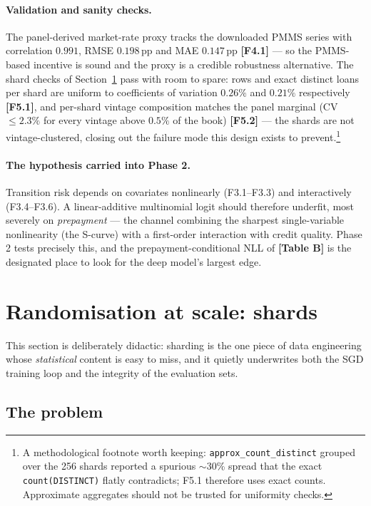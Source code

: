 \documentclass[11pt,a4paper]{article}
\newcommand{\code}[1]{\texttt{#1}}
\newcommand{\artifact}[1]{\textbf{[#1]}}
\begin{document}
\paragraph{Validation and sanity checks.} The panel-derived market-rate proxy tracks the downloaded PMMS series with correlation $0.991$, RMSE $0.198$\,pp and MAE $0.147$\,pp \artifact{F4.1} --- so the PMMS-based incentive is sound and the proxy is a credible robustness alternative. The shard checks of Section~\ref{sec:shards} pass with room to spare: rows and exact distinct loans per shard are uniform to coefficients of variation $0.26\%$ and $0.21\%$ respectively \artifact{F5.1}, and per-shard vintage composition matches the panel marginal (CV $\le 2.3\%$ for every vintage above $0.5\%$ of the book) \artifact{F5.2} --- the shards are not vintage-clustered, closing out the failure mode this design exists to prevent.\footnote{A methodological footnote worth keeping: \code{approx\_count\_distinct} grouped over the 256 shards reported a spurious $\sim$30\% spread that the exact \code{count(DISTINCT)} flatly contradicts; F5.1 therefore uses exact counts. Approximate aggregates should not be trusted for uniformity checks.}

\paragraph{The hypothesis carried into Phase 2.} Transition risk depends on covariates nonlinearly (F3.1--F3.3) and interactively (F3.4--F3.6). A linear-additive multinomial logit should therefore underfit, most severely on \emph{prepayment} --- the channel combining the sharpest single-variable nonlinearity (the S-curve) with a first-order interaction with credit quality. Phase 2 tests precisely this, and the prepayment-conditional NLL of \artifact{Table B} is the designated place to look for the deep model's largest edge.

\section{Randomisation at scale: shards}\label{sec:shards}

This section is deliberately didactic: sharding is the one piece of data engineering whose \emph{statistical} content is easy to miss, and it quietly underwrites both the SGD training loop and the integrity of the evaluation sets.

\subsection{The problem}
\end{document}
